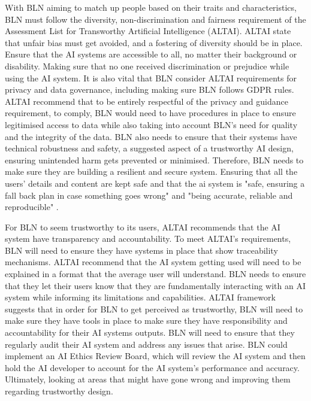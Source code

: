 \documentclass[a4paper,10pt]{article}
\begin{document}
	With BLN aiming to match up people based on their traits and characteristics, BLN must follow the diversity, non-discrimination and fairness requirement of the Assessment List for Transworthy Artificial Intelligence (ALTAI).  ALTAI state that unfair bias must get avoided, and a fostering of diversity should be in place. Ensure that the AI systems are accessible to all, no matter their background or disability. Making sure that no one received discrimination or prejudice while using the AI system. It is also vital that BLN consider ALTAI  requirements for privacy and data governance, including making sure BLN follows GDPR rules. ALTAI recommend that to be entirely respectful of the privacy and guidance requirement, to comply, BLN would need to have procedures in place to ensure legitimised access to data while also taking into account BLN's need for quality and the integrity of the data. BLN also needs to ensure that their systems have technical robustness and safety, a suggested aspect of a trustworthy AI design, ensuring unintended harm gets prevented or minimised. Therefore, BLN needs to make sure they are building a resilient and secure system. Ensuring that all the users' details and content are kept safe and that the ai system is "safe, ensuring a fall back plan in case something goes wrong" and "being accurate, reliable and reproducible" \cite{ALTAI_ws}. 
	
	For BLN to seem trustworthy to its users, ALTAI recommends that the AI system have transparency and accountability. To meet ALTAI's requirements, BLN will need to ensure they have systems in place that show traceability mechanisms. ALTAI recommend that the AI system getting used will need to be explained in a format that the average user will understand. BLN needs to ensure that they let their users know that they are fundamentally interacting with an AI system while informing its limitations and capabilities. ALTAI framework suggests that in order for BLN to get perceived as trustworthy, BLN will need to make sure they have tools in place to make sure they have responsibility and accountability for their AI systems outputs. BLN will need to ensure that they regularly audit their AI system and address any issues that arise. BLN could implement an AI Ethics Review Board, which will review the AI system and then hold the AI developer to account for the AI system's performance and accuracy. Ultimately, looking at areas that might have gone wrong and improving them regarding trustworthy design.
	
\end{document}
